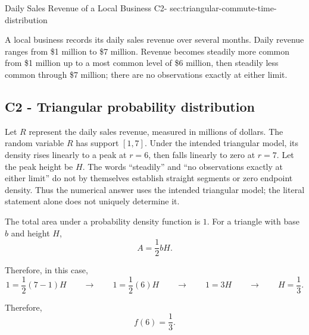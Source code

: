 	\sectionScored
	{Daily Sales Revenue of a Local Business}
	{C2-}
	{sec:triangular-commute-time-distribution}
	{
		A local business records its daily sales revenue over several months.
		Daily revenue ranges from \$1 million to \$7 million. Revenue becomes
		steadily more common from \$1 million up to a most common level of
		\$6 million, then steadily less common through \$7 million; there are
		no observations exactly at either limit.
		
		
		\label{subsec:triangular-commute-time-probabilities}
		\subsection*{C2 - Triangular probability distribution }
		
		Let \(R\) represent the daily sales revenue, measured in millions
		of dollars. The random variable \(R\) has support \([1,7]\).
		Under the intended triangular model, its density rises linearly to a peak at \(r=6\), then falls
		linearly to zero at \(r=7\). Let the peak height be \(H\).
        The words ``steadily'' and ``no observations exactly at either limit''
        do not by themselves establish straight segments or zero endpoint
        density. Thus the numerical answer uses the intended triangular model;
        the literal statement alone does not uniquely determine it.
		
		
		The total area under a probability density function is \(1\).
		For a triangle with base \(b\) and height \(H\),
		\[
		A=\frac12 bH.
		\]
		
		Therefore, in this case,
		\[
		1
		=
		\frac12(7-1)H
		\qquad \rightarrow \qquad
		1
		=
		\frac12(6)H
		\qquad \rightarrow \qquad
		1=3H
		\qquad \rightarrow \qquad
		H=\frac13.
		\]
		
		Therefore,
		\[
		f(6)=\frac13.
		\]
		
		
}
